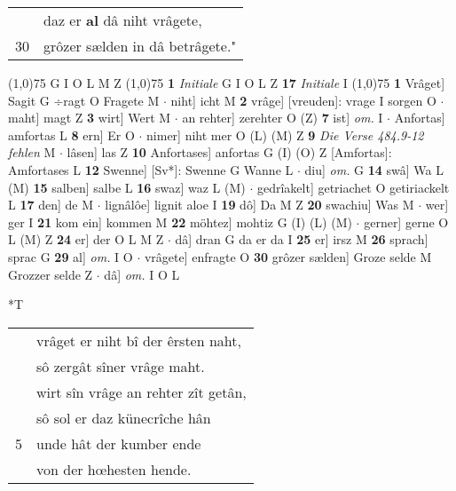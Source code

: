 \documentclass[8pt,a4paper,notitlepage]{article}
\begin{document}
\begin{table}[ht]
\begin{minipage}[t]{0.5\linewidth}
\begin{tabular}{rl}
 & daz er \textbf{al} dâ niht vrâgete,\\ 
30 & grôzer sælden in dâ betrâgete."\\ 
\end{tabular}
\scriptsize
\line(1,0){75} \newline
G I O L M Z \newline
\line(1,0){75} \newline
\textbf{1} \textit{Initiale} G I O L Z  \textbf{17} \textit{Initiale} I  \newline
\line(1,0){75} \newline
\textbf{1} Vrâget] Sagit G ÷ragt O Fragete M  $\cdot$ niht] icht M \textbf{2} vrâge] [vreuden]: vrage I sorgen O  $\cdot$ maht] magt Z \textbf{3} wirt] Wert M  $\cdot$ an rehter] zerehter O (Z) \textbf{7} ist] \textit{om.} I  $\cdot$ Anfortas] amfortas L \textbf{8} ern] Er O  $\cdot$ nimer] niht mer O (L) (M) Z \textbf{9} \textit{Die Verse 484.9-12 fehlen} M   $\cdot$ lâsen] las Z \textbf{10} Anfortases] anfortas G (I) (O) Z [Amfortas]: Amfortases L \textbf{12} Swenne] [Sv*]: Swenne G Wanne L  $\cdot$ diu] \textit{om.} G \textbf{14} swâ] Wa L (M) \textbf{15} salben] salbe L \textbf{16} swaz] waz L (M)  $\cdot$ gedrîakelt] getriachet O getiriackelt L \textbf{17} den] de M  $\cdot$ lignâlôe] lignit aloe I \textbf{19} dô] Da M Z \textbf{20} swachiu] Was M  $\cdot$ wer] ger I \textbf{21} kom ein] kommen M \textbf{22} möhtez] mohtiz G (I) (L) (M)  $\cdot$ gerner] gerne O L (M) Z \textbf{24} er] der O L M Z  $\cdot$ dâ] dran G da er da I \textbf{25} er] irsz M \textbf{26} sprach] sprac G \textbf{29} al] \textit{om.} I O  $\cdot$ vrâgete] enfragte O \textbf{30} grôzer sælden] Groze selde M Grozzer selde Z  $\cdot$ dâ] \textit{om.} I O L \newline
\end{minipage}
\hspace{0.5cm}
\begin{minipage}[t]{0.5\linewidth}
\small
\begin{center}*T
\end{center}
\begin{tabular}{rl}
 & vrâget er niht bî der êrsten naht,\\ 
 & sô zergât sîner vrâge maht.\\ 
 & wirt sîn vrâge an rehter zît getân,\\ 
 & sô sol er daz künecrîche hân\\ 
5 & unde hât der kumber ende\\ 
 & von der hœhesten hende.\\ 

\end{tabular}
\end{minipage}
\end{table}
\end{document}
